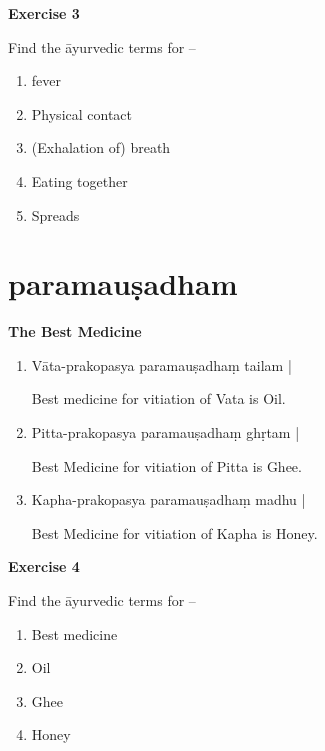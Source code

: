 \begin{center}
\textbf{Exercise 3}
\end{center}

Find the āyurvedic terms for –
\begin{enumerate}
\renewcommand{\theenumi}{\alph{enumi}}
\renewcommand{\labelenumi}{\theenumi.}
\item fever
\item Physical contact 
\item (Exhalation of) breath
\item Eating together 
\item Spreads 
\end{enumerate}

\chapter{paramauṣadham}

\begin{center}
\textbf{The Best Medicine}
\end{center}

\begin{enumerate}
\item {}

Vāta-prakopasya paramauṣadhaṃ tailam |

Best medicine for vitiation of Vata is Oil.

\item {}

Pitta-prakopasya paramauṣadhaṃ ghṛtam |

Best Medicine for vitiation of Pitta is Ghee.

\item {}

Kapha-prakopasya paramauṣadhaṃ madhu |

Best Medicine for vitiation of Kapha is Honey. 
\end{enumerate}

\begin{center}
\noindent\textbf{Exercise 4}
\end{center}

Find the āyurvedic terms for –
\begin{enumerate}
\renewcommand{\theenumi}{\alph{enumi}}
\renewcommand{\labelenumi}{\theenumi.}
\item Best medicine 
\item Oil
\item Ghee 
\item Honey
\end{enumerate}

